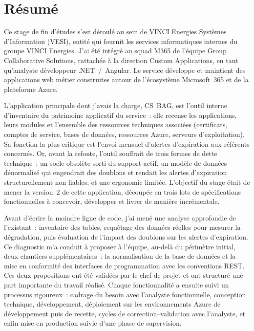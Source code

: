 \chapter*{Résumé}

Ce stage de fin d'études s'est déroulé au sein de VINCI Energies Systèmes
d'Information (VESI), entité qui fournit les services informatiques internes du
groupe VINCI Energies. J'ai été intégré au squad M365 de l'équipe Group
Collaborative Solutions, rattachée à la direction Custom Applications, en tant
qu'analyste développeur .NET~/~Angular. Le service développe et maintient des
applications web métier construites autour de l'écosystème Microsoft~365 et de
la plateforme Azure.

L'application principale dont j'avais la charge, CS~BAG, est l'outil interne
d'inventaire du patrimoine applicatif du service~: elle recense les
applications, leurs modules et l'ensemble des ressources techniques associées
(certificats, comptes de service, bases de données, ressources Azure, serveurs
d'exploitation). Sa fonction la plus critique est l'envoi mensuel d'alertes
d'expiration aux référents concernés. Or, avant la refonte, l'outil souffrait
de trois formes de dette technique~: un socle obsolète sorti du support actif,
un modèle de données dénormalisé qui engendrait des doublons et rendait les
alertes d'expiration structurellement non fiables, et une ergonomie limitée.
L'objectif du stage était de mener la version~2 de cette application, découpée
en trois lots de spécifications fonctionnelles à concevoir, développer et
livrer de manière incrémentale.

Avant d'écrire la moindre ligne de code, j'ai mené une analyse approfondie de
l'existant~: inventaire des tables, requêtage des données réelles pour mesurer
la dégradation, puis évaluation de l'impact des doublons sur les alertes
d'expiration. Ce diagnostic m'a conduit à proposer à l'équipe, au-delà du
périmètre initial, deux chantiers supplémentaires~: la normalisation de la base
de données et la mise en conformité des interfaces de programmation avec les
conventions REST. Ces deux propositions ont été validées par le chef de projet
et ont structuré une part importante du travail réalisé. Chaque fonctionnalité a
ensuite suivi un processus rigoureux~: cadrage du besoin avec l'analyste
fonctionnelle, conception technique, développement, déploiement sur les
environnements Azure de développement puis de recette, cycles de
correction--validation avec l'analyste, et enfin mise en production suivie
d'une phase de supervision.

